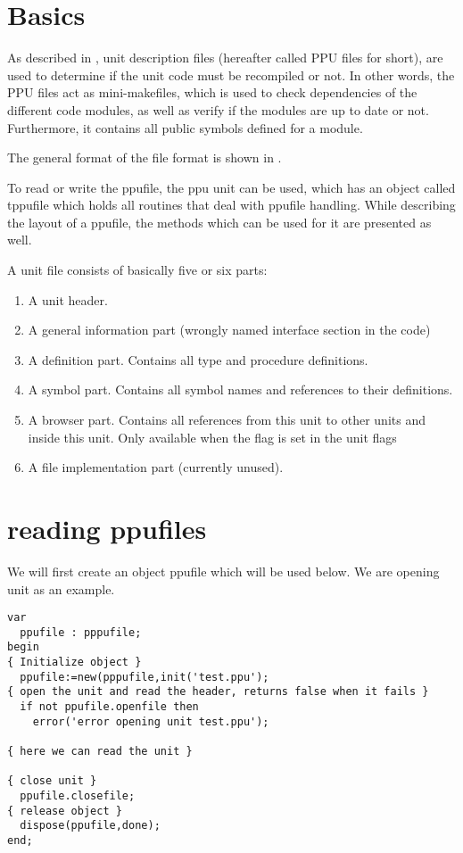 \section{Basics}
As described in , unit description files (hereafter
called PPU files for short), are used to determine if the unit
code must be recompiled or not. In other words, the PPU files act
as mini-makefiles, which is used to check dependencies of the
different code modules, as well as verify if the modules are up
to date or not. Furthermore, it contains all public symbols defined
for a module.

The general format of the  file format is shown
in .


To read or write the ppufile, the ppu unit  can be used,
which has an object called tppufile which holds all routines that deal
with ppufile handling. While describing the layout of a ppufile, the
methods which can be used for it are presented as well.

A unit file consists of basically five or six parts:
\begin{enumerate}
\item A unit header.
\item A general information part (wrongly named interface section in the code)
\item A definition part. Contains all type and procedure definitions.
\item A symbol part. Contains all symbol names and references to their
definitions.
\item A browser part. Contains all references from this unit to other
units and inside this unit. Only available when the  flag is
set in the unit flags
\item A file implementation part (currently unused).
\end{enumerate}

\section{reading ppufiles}

We will first create an object ppufile which will be used below. We are
opening unit  as an example.

\begin{verbatim}
var
  ppufile : pppufile;
begin
{ Initialize object }
  ppufile:=new(pppufile,init('test.ppu');
{ open the unit and read the header, returns false when it fails }
  if not ppufile.openfile then
    error('error opening unit test.ppu');

{ here we can read the unit }

{ close unit }
  ppufile.closefile;
{ release object }
  dispose(ppufile,done);
end;
\end{verbatim}

